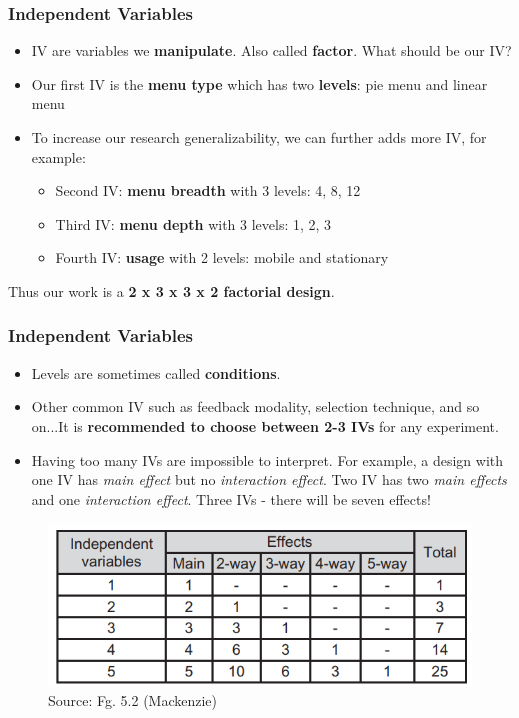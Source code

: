 \documentclass{beamer}
\begin{document}
\begin{frame}
\frametitle{Independent Variables}
\begin{itemize}
	\item IV are variables we \textbf{manipulate}.  Also called \textbf{factor}.  What should be our IV?
\end{itemize}
\begin{itemize}
	\item Our first IV is the \textbf{menu type} which has two \textbf{levels}: pie menu and linear menu
	\item To increase our research generalizability, we can further adds more IV, for example:
	\begin{itemize}
		\item Second IV: \textbf{menu breadth} with 3 levels: 4, 8, 12
		\item Third IV: \textbf{menu depth} with 3 levels: 1, 2, 3
		\item Fourth IV: \textbf{usage} with 2 levels: mobile and stationary
	\end{itemize}
\end{itemize}
Thus our work is a \textbf{2 x 3 x 3 x 2 factorial design}.
\end{frame}

\begin{frame}
\frametitle{Independent Variables}
\begin{itemize}
	\item Levels are sometimes called \textbf{conditions}.
	\item Other common IV such as feedback modality, selection technique, and so on...It is \textbf{recommended to choose between 2-3 IVs} for any experiment.
	\item Having too many IVs are impossible to interpret.  For example, a design with one IV has \textit{main effect} but no \textit{interaction effect}.  Two IV has two \textit{main effects} and one \textit{interaction effect}.  Three IVs - there will be seven effects!
\end{itemize}
	\begin{figure}
		\includegraphics[width=0.5\linewidth]{effect}
		\caption{Source: Fg. 5.2 (Mackenzie)}
	\end{figure}
\end{frame}
\end{document}
